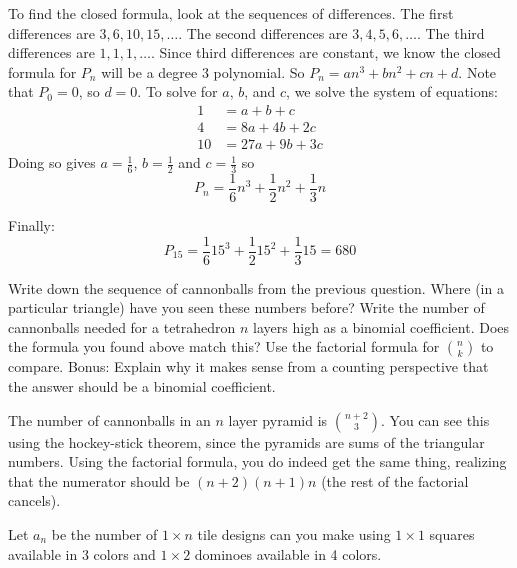 \documentclass[11pt]{exam}
\begin{document}
\begin{questions}
\begin{solution}
	  	To find the closed formula, look at the sequences of differences.  The first differences are $3, 6, 10, 15, \ldots$.  The second differences are $3, 4, 5, 6, \ldots$.  The third differences are $1,1,1,\ldots$.  Since third differences are constant, we know the closed formula for $P_n$ will be a degree 3 polynomial.  So $P_n = an^3 + b n^2 + cn + d$.  Note that $P_0 = 0$, so $d = 0$.  To solve for $a$, $b$, and $c$, we solve the system of equations:
	  \begin{align*}
	    1 & = a + b + c \\
	    4 & = 8a+ 4b + 2c \\
	    10 & = 27a + 9b + 3c
	  \end{align*}
	  Doing so gives $a = \frac{1}{6}$, $b = \frac{1}{2}$ and $c = \frac{1}{3}$ so
	  \[P_n = \frac{1}{6}n^3 + \frac{1}{2} n^2 + \frac{1}{3} n\]

	Finally:
	  \[P_{15} = \frac{1}{6}15^3 + \frac{1}{2} 15^2 + \frac{1}{3} 15 = 680\]
	\end{solution}


	\question[4] Write down the sequence of cannonballs from the previous question.  Where (in a particular triangle) have you seen these numbers before?  Write the number of cannonballs needed for a tetrahedron $n$ layers high as a binomial coefficient.  Does the formula you found above match this?  Use the factorial formula for $\binom{n}{k}$ to compare.  Bonus: Explain why it makes sense from a counting perspective that the answer should be a binomial coefficient.

  \begin{solution}
    The number of cannonballs in an $n$ layer pyramid is $\binom{n+2}{3}$.  You can see this using the hockey-stick theorem, since the pyramids are sums of the triangular numbers.  Using the factorial formula, you do indeed get the same thing, realizing that the numerator should be $(n+2)(n+1)n$ (the rest of the factorial cancels).
  \end{solution}


  \question Let $a_n$ be the number of  $1 \times n$ tile designs can you make using $1 \times 1$ squares available in 3 colors and $1 \times 2$ dominoes available in 4 colors.
\end{questions}
\end{document}
